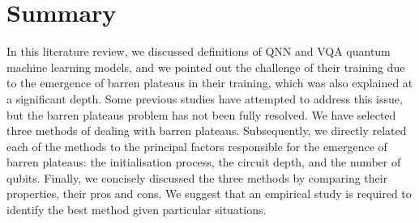\section{Summary}
In this literature review, we discussed definitions of QNN and VQA quantum machine learning models, and we pointed out the challenge of their training due to the emergence of barren plateaus in their training, which was also explained at a significant depth.
Some previous studies have attempted to address this issue, but the barren plateaus problem has not been fully resolved.
We have selected three methods of dealing with barren plateaus.
Subsequently, we directly related each of the methods to the principal factors responsible for the emergence of barren plateaus: the initialisation process, the circuit depth, and the number of qubits.
Finally, we concisely discussed the three methods by comparing their properties, their pros and cons.
We suggest that an empirical study is required to identify the best method given particular situations.
